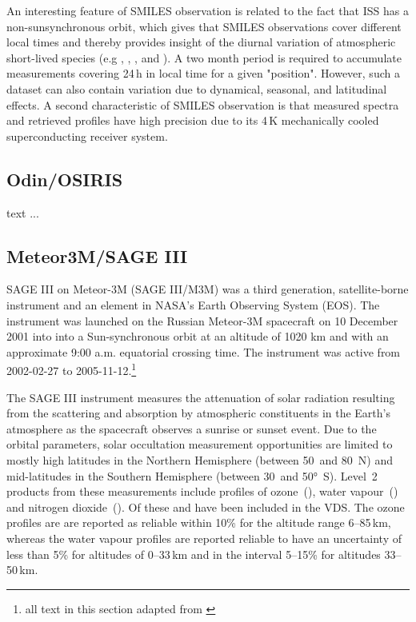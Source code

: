 An interesting feature of SMILES observation is related to the fact
that ISS has a non-sunsynchronous orbit, which gives that SMILES 
observations cover different local times and thereby provides insight
of the diurnal variation of atmospheric short-lived species
(e.g , , , and ). 
A two month period is required to accumulate measurements covering 
24\,h in local time for a given "position". However, such a 
dataset can also contain variation due to dynamical, seasonal, and 
latitudinal effects.
A second characteristic of SMILES observation is that 
measured spectra and retrieved profiles have high precision due 
to its 4\,K mechanically cooled superconducting receiver system.



\subsection{Odin/OSIRIS}
 
text ...

\subsection{Meteor3M/SAGE III}
SAGE III on Meteor-3M (SAGE III/M3M) was a third generation, satellite-borne
instrument and an element in NASA’s Earth Observing System (EOS). The
instrument was launched on the Russian Meteor-3M spacecraft on 10 December 2001
into into a Sun-synchronous orbit at an altitude of 1020 km and with an
approximate 9:00 a.m. equatorial crossing time.  The instrument was active from
2002-02-27 to 2005-11-12.\footnote{all text in this section adapted from
\cite{SAGEIII_DPUG}}

The SAGE III instrument measures the attenuation of solar radiation resulting
from the scattering and absorption by atmospheric constituents in the Earth’s
atmosphere as the spacecraft observes a sunrise or sunset event.  Due to the
orbital parameters, solar occultation measurement opportunities are limited to
mostly high latitudes in the Northern Hemisphere (between 50\degree~and
80\degree~N) and mid-latitudes in the Southern Hemisphere (between
30\degree~and 50°~S).  Level~2 products from these measurements include
profiles of ozone~(), water vapour~() and nitrogen
dioxide~().  Of these  and  have been included
in the VDS.  The ozone profiles are are reported as reliable within 10\% for
the altitude range 6--85\,km, whereas the water vapour profiles are reported
reliable to have an uncertainty of less than 5\% for altitudes of 0--33\,km and
in the interval 5--15\% for altitudes 33--50\,km.

